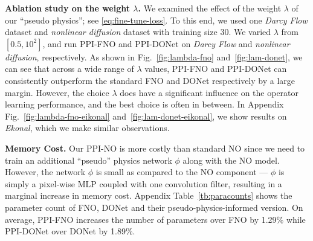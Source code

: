 \noindent\textbf{Ablation study on the weight $\lambda$.} We examined the effect of the weight $\lambda$ of our ``pseudo physics''; see \eqref{eq:fine-tune-loss}. To this end, we used one \textit{Darcy Flow} dataset and \textit{nonlinear diffusion} dataset with training size 30. We varied $\lambda$ from $[0.5, 10^2]$, and run PPI-FNO and PPI-DONet on \textit{Darcy Flow} and \textit{nonlinear diffusion}, respectively. As shown in Fig.~\ref{fig:lambda-fno} and~\ref{fig:lam-donet}, we can see that across a wide range of $\lambda$ values, PPI-FNO and PPI-DONet can consistently outperform the standard FNO and DONet respectively by a large margin. However, the choice $\lambda$ does have a significant influence on the operator learning performance, and the best choice is often in between. In Appendix Fig.~\ref{fig:lambda-fno-eikonal} and~\ref{fig:lam-donet-eikonal}, we show results on \textit{Ekonal}, which we make similar observations. 


\textbf{Memory Cost.} 
Our PPI-NO is more costly than standard NO since we need to train an additional ``pseudo'' physics network $\phi$ along with the NO model. However,  the network $\phi$
is small as compared to the NO component --- $\phi$ is simply a pixel-wise MLP coupled with one convolution filter, resulting in a marginal increase in memory cost. Appendix Table~\ref{tb:paracounts}  shows the parameter count of FNO, DONet and their pseudo-physics-informed version. On average, PPI-FNO increases the number of parameters over FNO by 1.29\% while PPI-DONet over DONet by 1.89\%.



